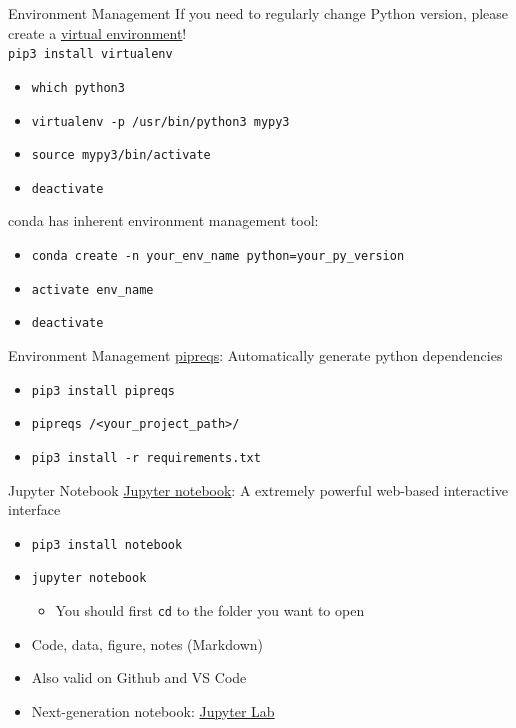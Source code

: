\documentclass{../TexTemplate/myslide}
\begin{document}
\begin{frame}[fragile]{Environment Management}
If you need to regularly change Python version, please create a \href{https://virtualenv.pypa.io/en/latest/}{virtual environment}!\\
\verb'pip3 install virtualenv'
\begin{itemize}
	\item \verb'which python3'
	\item \verb'virtualenv -p /usr/bin/python3 mypy3'
	\item \verb'source mypy3/bin/activate'
	\item \verb'deactivate'
\end{itemize}
conda has inherent environment management tool:
\begin{itemize}
	\item \verb'conda create -n your_env_name python=your_py_version'
	\item \verb'activate env_name'
	\item \verb'deactivate'
\end{itemize}
\end{frame}

\begin{frame}[fragile]{Environment Management}
\href{https://dev.to/bhupesh/pipreqs-automatically-generate-python-dependencies-30nl}{pipreqs}: Automatically generate python dependencies
\begin{itemize}
	\item \verb'pip3 install pipreqs'
	\item \verb'pipreqs /<your_project_path>/'
	\item \verb'pip3 install -r requirements.txt'
\end{itemize}
\end{frame}

\begin{frame}[fragile]{Jupyter Notebook}
\href{https://jupyter.org/}{Jupyter notebook}: A extremely powerful web-based interactive interface
\begin{itemize}
	\item \verb'pip3 install notebook'
	\item \verb'jupyter notebook'
	\begin{itemize}
		\item You should first \verb'cd' to the folder you want to open
	\end{itemize}
	\item Code, data, figure, notes (Markdown)
	\item Also valid on Github and VS Code
	\item Next-generation notebook: \href{https://jupyter.org/}{Jupyter Lab}
\end{itemize}
\end{frame}
\end{document}
